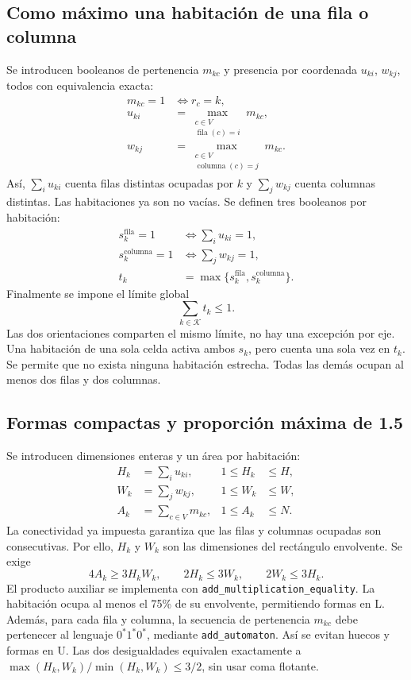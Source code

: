 \documentclass[11pt,a4paper]{article}
\begin{document}
\subsection{Como m\'aximo una habitaci\'on de una fila o columna}

Se introducen booleanos de pertenencia $m_{kc}$ y presencia por
coordenada $u_{ki}$, $w_{kj}$, todos con equivalencia exacta:
\begin{align}
 m_{kc}=1&\Longleftrightarrow r_c=k,\\
 u_{ki}&=\max_{\substack{c\in V\\\operatorname{fila}(c)=i}}m_{kc},\\
 w_{kj}&=\max_{\substack{c\in V\\\operatorname{columna}(c)=j}}m_{kc}.
\end{align}
As\'i, $\sum_i u_{ki}$ cuenta filas distintas ocupadas por $k$ y
$\sum_j w_{kj}$ cuenta columnas distintas. Las habitaciones ya son
no vac\'ias. Se definen tres booleanos por habitaci\'on:
\begin{align}
 s_k^{\mathrm{fila}}=1
   &\Longleftrightarrow \sum_i u_{ki}=1,\\
 s_k^{\mathrm{columna}}=1
   &\Longleftrightarrow \sum_j w_{kj}=1,\\
 t_k&=\max\{s_k^{\mathrm{fila}},s_k^{\mathrm{columna}}\}.
\end{align}
Finalmente se impone el l\'imite global
\[
 \boxed{\sum_{k\in\mathcal K}t_k\leq1.}
\]
Las dos orientaciones comparten el mismo l\'imite, no hay una
excepci\'on por eje. Una habitaci\'on de una sola celda activa ambos
$s_k$, pero cuenta una sola vez en $t_k$. Se permite que no exista
ninguna habitaci\'on estrecha. Todas las dem\'as ocupan al menos
dos filas y dos columnas.

\subsection{Formas compactas y proporci\'on m\'axima de 1.5}

Se introducen dimensiones enteras y un \'area por habitaci\'on:
\begin{align}
 H_k&=\sum_i u_{ki},&1\leq H_k&\leq H,\\
 W_k&=\sum_j w_{kj},&1\leq W_k&\leq W,\\
 A_k&=\sum_{c\in V}m_{kc},&1\leq A_k&\leq N.
\end{align}
La conectividad ya impuesta garantiza que las filas y columnas
ocupadas son consecutivas. Por ello, $H_k$ y $W_k$ son las
dimensiones del rect\'angulo envolvente. Se exige
\[
 \boxed{4A_k\geq3H_kW_k,\qquad
        2H_k\leq3W_k,\qquad 2W_k\leq3H_k.}
\]
El producto auxiliar se implementa con
\texttt{add\_multiplication\_equality}. La habitaci\'on ocupa al
menos el 75\% de su envolvente, permitiendo formas en L.
Adem\'as, para cada fila y columna, la secuencia de pertenencia
$m_{kc}$ debe pertenecer al lenguaje $0^*1^*0^*$, mediante
\texttt{add\_automaton}. As\'i se evitan huecos y formas en U.
Las dos desigualdades equivalen exactamente a
$\max(H_k,W_k)/\min(H_k,W_k)\leq3/2$, sin usar coma flotante.
\end{document}
